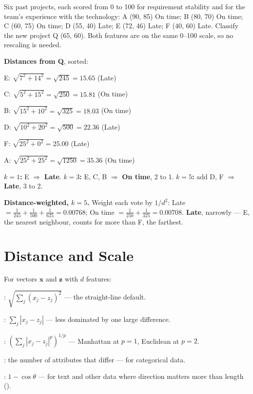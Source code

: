 \begin{worked}
Six past projects, each scored from 0 to 100 for requirement stability and for
the team's experience with the technology:
A (90, 85) On time; B (80, 70) On time; C (60, 75) On time; D (55, 40) Late;
E (72, 46) Late; F (40, 60) Late. Classify the new project Q (65, 60). Both
features are on the same 0--100 scale, so no rescaling is needed.

\smallskip
\textbf{Distances from Q}, sorted:
\begin{tight}
  \item E: $\sqrt{7^2 + 14^2} = \sqrt{245} = 15.65$ \quad (Late)
  \item C: $\sqrt{5^2 + 15^2} = \sqrt{250} = 15.81$ \quad (On time)
  \item B: $\sqrt{15^2 + 10^2} = \sqrt{325} = 18.03$ \quad (On time)
  \item D: $\sqrt{10^2 + 20^2} = \sqrt{500} = 22.36$ \quad (Late)
  \item F: $\sqrt{25^2 + 0^2} = 25.00$ \quad (Late)
  \item A: $\sqrt{25^2 + 25^2} = \sqrt{1250} = 35.36$ \quad (On time)
\end{tight}
\textbf{$k = 1$:} E $\Rightarrow$ \textbf{Late}. \quad
\textbf{$k = 3$:} E, C, B $\Rightarrow$ \textbf{On time}, 2 to 1. \quad
\textbf{$k = 5$:} add D, F $\Rightarrow$ \textbf{Late}, 3 to 2.

\smallskip
\textbf{Distance-weighted, $k = 5$.} Weight each vote by $1/d^2$:
Late $= \tfrac{1}{245} + \tfrac{1}{500} + \tfrac{1}{625} = 0.00768$;
On time $= \tfrac{1}{250} + \tfrac{1}{325} = 0.00708$. \textbf{Late}, narrowly --- E,
the nearest neighbour, counts for more than F, the farthest.
\end{worked}

\section{Distance and Scale}

\begin{definitionbox}
For vectors $\mathbf{x}$ and $\mathbf{z}$ with $d$ features:
\begin{tight}
  \item {}: $\sqrt{\sum_j (x_j - z_j)^2}$ --- the straight-line
        default.
  \item {}: $\sum_j |x_j - z_j|$ --- less dominated by one large
        difference.
  \item {}: $\left(\sum_j |x_j - z_j|^p\right)^{1/p}$ --- Manhattan
        at $p = 1$, Euclidean at $p = 2$.
  \item {}: the number of attributes that differ --- for categorical
        data.
  \item {}: $1 - \cos\theta$ --- for text and other data where
        direction matters more than length ().
\end{tight}
\end{definitionbox}

